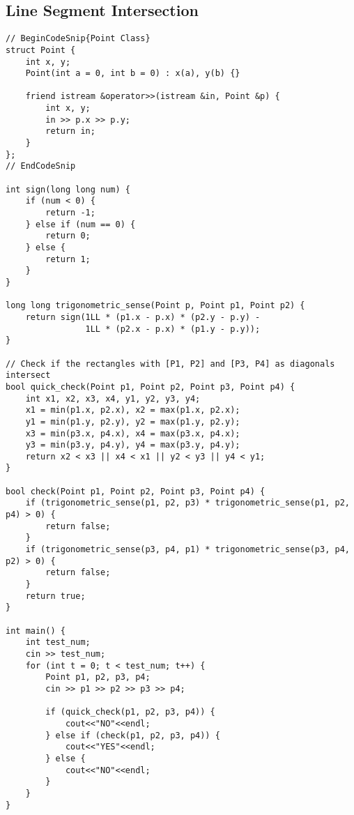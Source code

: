 \documentclass{article}
\begin{document}
\subsection{Line Segment Intersection}
\begin{lstlisting}
// BeginCodeSnip{Point Class}
struct Point {
	int x, y;
	Point(int a = 0, int b = 0) : x(a), y(b) {}

	friend istream &operator>>(istream &in, Point &p) {
		int x, y;
		in >> p.x >> p.y;
		return in;
	}
};
// EndCodeSnip

int sign(long long num) {
	if (num < 0) {
		return -1;
	} else if (num == 0) {
		return 0;
	} else {
		return 1;
	}
}

long long trigonometric_sense(Point p, Point p1, Point p2) {
	return sign(1LL * (p1.x - p.x) * (p2.y - p.y) -
	            1LL * (p2.x - p.x) * (p1.y - p.y));
}

// Check if the rectangles with [P1, P2] and [P3, P4] as diagonals intersect
bool quick_check(Point p1, Point p2, Point p3, Point p4) {
	int x1, x2, x3, x4, y1, y2, y3, y4;
	x1 = min(p1.x, p2.x), x2 = max(p1.x, p2.x);
	y1 = min(p1.y, p2.y), y2 = max(p1.y, p2.y);
	x3 = min(p3.x, p4.x), x4 = max(p3.x, p4.x);
	y3 = min(p3.y, p4.y), y4 = max(p3.y, p4.y);
	return x2 < x3 || x4 < x1 || y2 < y3 || y4 < y1;
}

bool check(Point p1, Point p2, Point p3, Point p4) {
	if (trigonometric_sense(p1, p2, p3) * trigonometric_sense(p1, p2, p4) > 0) {
		return false;
	}
	if (trigonometric_sense(p3, p4, p1) * trigonometric_sense(p3, p4, p2) > 0) {
		return false;
	}
	return true;
}

int main() {
	int test_num;
	cin >> test_num;
	for (int t = 0; t < test_num; t++) {
		Point p1, p2, p3, p4;
		cin >> p1 >> p2 >> p3 >> p4;

		if (quick_check(p1, p2, p3, p4)) {
			cout<<"NO"<<endl;
		} else if (check(p1, p2, p3, p4)) {
			cout<<"YES"<<endl;
		} else {
			cout<<"NO"<<endl;
		}
	}
}
\end{lstlisting}
\end{document}
